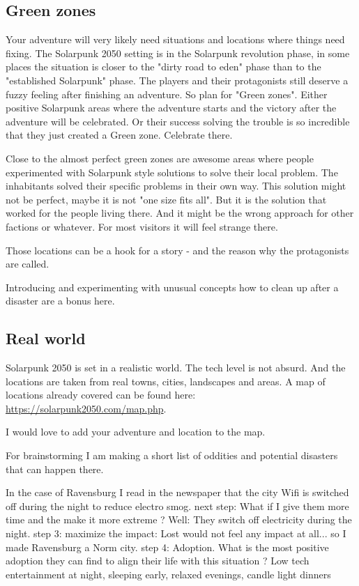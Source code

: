 \subsection{Green zones}

Your adventure will very likely need situations and locations where things need fixing. The Solarpunk 2050 setting is in the Solarpunk revolution phase, in some places the situation is closer to the "dirty road to eden" phase than to the "established Solarpunk" phase. The players and their protagonists still deserve a fuzzy feeling after finishing an adventure. So plan for "Green zones". Either positive Solarpunk areas where the adventure starts and the victory after the adventure will be celebrated. Or their success solving the trouble is so incredible that they just created a Green zone. Celebrate there.

Close to the almost perfect green zones are awesome areas where people experimented with Solarpunk style solutions to solve their local problem. The inhabitants solved their specific problems in their own way. This solution might not be perfect, maybe it is not "one size fits all". But it is the solution that worked for the people living there. And it might be the wrong approach for other factions or whatever. For most visitors it will feel strange there.

Those locations can be a hook for a story - and the reason why the protagonists are called.

Introducing and experimenting with unusual concepts how to clean up after a disaster are a bonus here.

\subsection{Real world}

Solarpunk 2050 is set in a realistic world. The tech level is not absurd. And the locations are taken from real towns, cities, landscapes and areas. A map of locations already covered can be found here: \href{https://solarpunk2050.com/map.php}{https://solarpunk2050.com/map.php}.

I would love to add your adventure and location to the map.

For brainstorming I am making a short list of oddities and potential disasters that can happen there.

In the case of Ravensburg I read in the newspaper that the city Wifi is switched off during the night to reduce electro smog.
next step: What if I give them more time and the make it more extreme ? Well: They switch off electricity during the night.
step 3: maximize the impact: Lost would not feel any impact at all... so I made Ravensburg a Norm city.
step 4: Adoption. What is the most positive adoption they can find to align their life with this situation ? Low tech entertainment at night, sleeping early, relaxed evenings, candle light dinners

